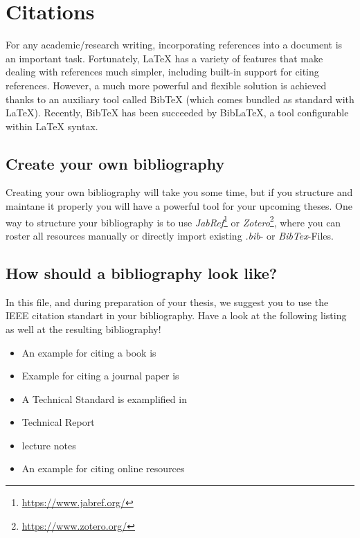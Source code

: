 \chapter{Citations}
For any academic/research writing, incorporating references into a document is an important task. Fortunately, LaTeX has a variety of features that make dealing with references much simpler, including built-in support for citing references. However, a much more powerful and flexible solution is achieved thanks to an auxiliary tool called BibTeX (which comes bundled as standard with LaTeX). Recently, BibTeX has been succeeded by BibLaTeX, a tool configurable within LaTeX syntax.

\section{Create your own bibliography}
Creating your own bibliography will take you some time, but if you structure and maintane it properly you will have a powerful tool for your upcoming theses. One way to structure your bibliography is to use \emph{JabRef}\footnote{\url{https://www.jabref.org/}} or \emph{Zotero}\footnote{\url{https://www.zotero.org/}}, where you can roster all resources manually or directly import existing \emph{.bib}- or \emph{BibTex}-Files.

\section{How should a bibliography look like?}
In this file, and during preparation of your thesis, we suggest you to use the IEEE citation standart in your bibliography. Have a look at the following listing as well at the resulting bibliography!

\begin{itemize}
	\item An example for citing a book is \cite{Mendel2007}\cite{MowlaeePejman2016}
	\item Example for citing a journal paper is \cite{MayerEtAl2017}
	\item A Technical Standard is examplified in \cite{Prechtl2006}
	\item Technical Report \cite{Mathworks2017}
	\item lecture notes \cite{Okorn2017}
	\item An example for citing online resources \cite{Goeschka}	
\end{itemize}